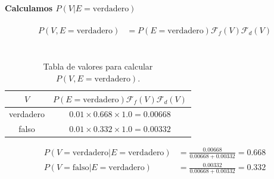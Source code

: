 \documentclass[12pt]{article}
\begin{document}
\paragraph{Calculamos $P(V|E=\text{verdadero})$}
\begin{equation}
\begin{split}
P(V,E=\text{verdadero})&=P(E=\text{verdadero})\mathcal{F}_f(V)\mathcal{F}_d(V)\\
\end{split}
\end{equation}\\
\begin{table}[h!]
	\centering
	\begin{tabular}{|c|c|}
		\hline
		\rowcolor[gray]{.8}
		$V$&$P(E=\text{verdadero})\mathcal{F}_f(V)\mathcal{F}_d(V)$ \\\hline %
		verdadero & $0.01\times0.668\times1.0=0.00668$\\\hline
		falso & $0.01\times0.332\times1.0=0.00332$\\\hline
	\end{tabular}
	\caption{Tabla de valores para calcular $P(V,E=\text{verdadero})$.}
	\label{tab:ej3013}
\end{table}
\begin{equation}
\begin{split}
P(V=\text{verdadero}|E=\text{verdadero})&=\frac{0.00668}{0.00668+0.00332}= 0.668\\
P(V=\text{falso}|E=\text{verdadero})&=\frac{0.00332}{0.00668+0.00332}= 0.332\\
\end{split}
\end{equation}
\end{document}
